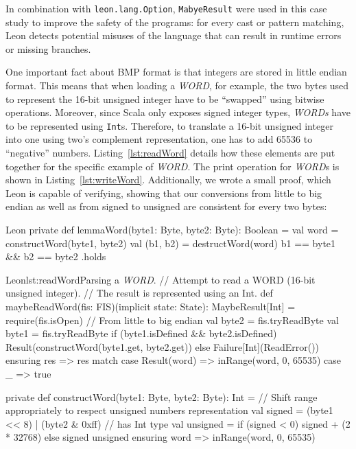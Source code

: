 \documentclass[a4paper,twoside]{article}
\newcommand{\InlineS}[1]{\lstinline[language=Leon]|#1|}
\newcommand{\RefCode}[1]{Listing~\ref{#1}}
\begin{document}
In combination with \InlineS{leon.lang.Option}, \InlineS{MabyeResult} were used
in this case study to improve the safety of the programs: for every cast or
pattern matching, Leon detects potential misuses of the language that can result
in runtime errors or missing branches.

One important fact about BMP format is that integers are stored in little endian
format. This means that when loading a \emph{WORD}, for example, the two bytes
used to represent the 16-bit unsigned integer have to be ``swapped'' using
bitwise operations. Moreover, since Scala only exposes signed integer types,
\emph{WORDs} have to be represented using \InlineS{Int}s. Therefore, to
translate a 16-bit unsigned integer into one using two's complement
representation, one has to add 65536 to ``negative'' numbers.
\RefCode{lst:readWord} details how these elements are put together for the
specific example of \emph{WORD}. The print operation for \emph{WORD}s is shown
in \RefCode{lst:writeWord}. Additionally, we wrote a small proof, which Leon is
capable of verifying, showing that our conversions from little to big endian as
well as from signed to unsigned are consistent for every two bytes:
\begin{ShortCode}{Leon}
private def lemmaWord(byte1: Byte, byte2: Byte): Boolean = {
  val word = constructWord(byte1, byte2)
  val (b1, b2) = destructWord(word)
  b1 == byte1 && b2 == byte2
}.holds
\end{ShortCode}

\begin{Code}{Leon}{lst:readWord}{Parsing a \emph{WORD}.}
// Attempt to read a WORD (16-bit unsigned integer).
// The result is represented using an Int.
def maybeReadWord(fis: FIS)(implicit state: State): MaybeResult[Int] = {
  require(fis.isOpen)
  // From little to big endian
  val byte2 = fis.tryReadByte
  val byte1 = fis.tryReadByte
  if (byte1.isDefined && byte2.isDefined)
    Result(constructWord(byte1.get, byte2.get))
  else
    Failure[Int](ReadError())
} ensuring { res =>
  res match {
    case Result(word) => inRange(word, 0, 65535)
    case _            => true
  }
}

private def constructWord(byte1: Byte, byte2: Byte): Int = {
  // Shift range appropriately to respect unsigned numbers representation
  val signed   = (byte1 << 8) | (byte2 & 0xff) // has Int type
  val unsigned = if (signed < 0) signed + (2 * 32768) else signed
  unsigned
} ensuring { word => inRange(word, 0, 65535) }
\end{Code}
\end{document}
